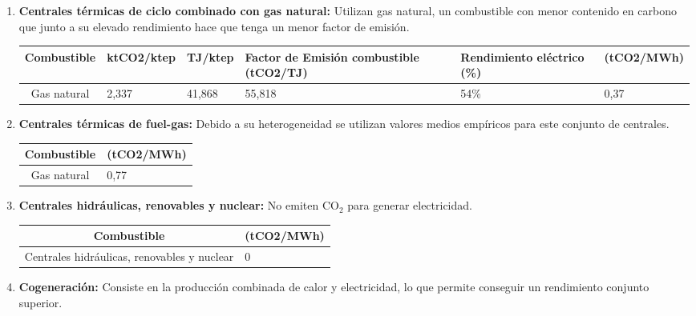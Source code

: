 \begin{enumerate}
	\item \textbf{Centrales térmicas de ciclo combinado con gas natural:}
		Utilizan gas natural, un combustible con menor contenido en carbono que junto a su elevado rendimiento hace que tenga un menor factor de emisión.
		\begin{table}[H]
		\centering
		\renewcommand{\arraystretch}{1.1}
		\begin{tabular}{cm{2cm}m{2cm}m{3cm}m{2cm}m{2cm}}
			\hline
			\textbf{Combustible} & \textbf{ktCO2/ktep} & \textbf{TJ/ktep} & \textbf{Factor de Emisión  combustible (tCO2/TJ)} & \textbf{Rendimiento eléctrico (\%)} & (tCO2/MWh)\\  
			\hline
			Gas natural & 2,337 & 41,868 & 55,818 & 54\% & 0,37 \\
		 \hline
		\end{tabular}
	\end{table}
	\newpage
	\item \textbf{Centrales térmicas de fuel-gas:}
		Debido a su heterogeneidad se utilizan valores medios empíricos para este conjunto de centrales.
				\begin{table}[H]
			\centering
			\renewcommand{\arraystretch}{1.1}
			\begin{tabular}{cm{2cm}}
				\hline
				\textbf{Combustible}  & (tCO2/MWh)\\  
				\hline
				Gas natural & 0,77 \\
				\hline
			\end{tabular}
		\end{table}
	\item \textbf{Centrales hidráulicas, renovables y nuclear:}
		No emiten CO$_2$ para generar electricidad.
		\begin{table}[H]
			\centering
			\renewcommand{\arraystretch}{1.1}
			\begin{tabular}{cm{2cm}}
				\hline
				\textbf{Combustible}  & (tCO2/MWh)\\  
				\hline
				Centrales hidráulicas, renovables y nuclear & 0
				 \\
				\hline
			\end{tabular}
		\end{table}
	\item \textbf{Cogeneración:}
		Consiste en la producción combinada de calor y electricidad, lo que permite conseguir un rendimiento conjunto superior.
		\begin{table}[H]
			\centering
			\renewcommand{\arraystretch}{1.1}
			\begin{tabular}{cm{2cm}}
				\hline

\end{tabular}
\end{table}
\end{enumerate}
